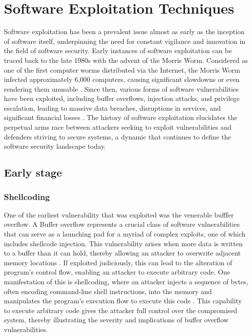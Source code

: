 \documentclass{article}
\begin{document}
\section{Software Exploitation Techniques}%
Software exploitation has been a prevalent issue almost as early as the
inception of software itself, underpinning the need for constant vigilance and
innovation in the field of software security. Early instances of software
exploitation can be traced back to the late 1980s with the advent of the Morris
Worm. Considered as one of the first computer worms distributed via the
Internet, the Morris Worm infected approximately 6,000 computers, causing
significant slowdowns or even rendering them unusable
\cite{spafford1989internet}. Since then, various forms of software
vulnerabilities have been exploited, including buffer overflows, injection
attacks, and privilege escalation, leading to massive data breaches, disruptions
in services, and significant financial losses \cite{owasp2017}. The history of
software exploitation elucidates the perpetual arms race between attackers
seeking to exploit vulnerabilities and defenders striving to secure systems, a
dynamic that continues to define the software security landscape today.

\subsection{Early stage}
\subsubsection{Shellcoding}
\begin{comment}
  shellcoding
  reference smashing the stack for fun and profit
\end{comment}
One of the earliest vulnerability that was exploited was the venerable bufffer
overflow. A Buffer overflow represents a crucial class of software
vulnerabilities that can serve as a launching pad for a myriad of complex
exploits, one of which includes shellcode injection. This vulnerability arises
when more data is written to a buffer than it can hold, thereby allowing an
attacker to overwrite adjacent memory locations \cite{seacord2013}. If exploited
judiciously, this can lead to the alteration of program's control flow, enabling
an attacker to execute arbitrary code. One manifestation of this is shellcoding,
where an attacker injects a sequence of bytes, often encoding command-line shell
instructions, into the memory and manipulates the program's execution flow to
execute this code \cite{one1996smashing}. This capability to execute arbitrary
code gives the attacker full control over the compromised system, thereby
illustrating the severity and implications of buffer overflow vulnerabilities.
\end{document}
